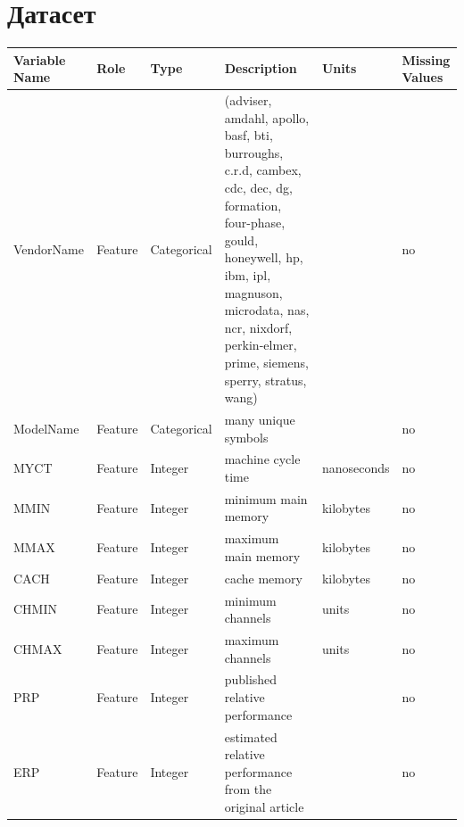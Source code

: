 \section{Датасет}

\begin{longtable}{|p{3cm}|p{2cm}|p{2.5cm}|p{6cm}|p{3cm}|p{3cm}|}
\hline
\textbf{Variable Name} & \textbf{Role} & \textbf{Type} & \textbf{Description} & \textbf{Units} & \textbf{Missing Values} \\
\hline

VendorName & Feature & Categorical & (adviser, amdahl, apollo, basf, bti, burroughs, c.r.d, cambex, cdc, dec, dg, formation, four-phase, gould, honeywell, hp, ibm, ipl, magnuson, microdata, nas, ncr, nixdorf, perkin-elmer, prime, siemens, sperry, stratus, wang) &  & no \\
\hline

ModelName & Feature & Categorical & many unique symbols &  & no \\
\hline

MYCT & Feature & Integer & machine cycle time & nanoseconds & no \\
\hline

MMIN & Feature & Integer & minimum main memory & kilobytes & no \\
\hline

MMAX & Feature & Integer & maximum main memory & kilobytes & no \\
\hline

CACH & Feature & Integer & cache memory & kilobytes & no \\
\hline

CHMIN & Feature & Integer & minimum channels & units & no \\
\hline

CHMAX & Feature & Integer & maximum channels & units & no \\
\hline

PRP & Feature & Integer & published relative performance &  & no \\
\hline

ERP & Feature & Integer & estimated relative performance from the original article &  & no \\
\hline

\end{longtable}


\endinput